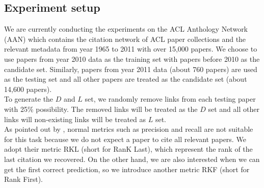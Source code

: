 \documentclass{article} %
\begin{document}
\subsection{Experiment setup}
We are currently conducting the experiments on the ACL Anthology Network (AAN) \cite{Radev&al.09,Radev&al.09a} which contains the citation network of ACL paper collections and the relevant metadata from year 1965 to 2011 with over 15,000 papers. We choose to use papers from year 2010 data as the training set with papers before 2010 as the candidate set. Similarly, papers from year 2011 data (about 760 papers) are used as the testing set and all other papers are treated as the candidate set (about 14,600 papers).\\
  To generate the $D$ and $L$ set, we randomly remove links from each testing paper with 25\% possibility. The removed links will be treated as the $D$ set and all other links will non-existing links will be treated as $L$ set.\\
As pointed out by \cite{nallapati2008joint}, normal metrics such as precision and recall are not suitable for this task because we do not expect a paper to cite all relevant papers. We adopt their metric RKL (short for RanK Last), which represent the rank of the last citation we recovered. On the other hand, we are also interested when we can get the first correct prediction, so we introduce another metric RKF (short for Rank First).
\end{document}
